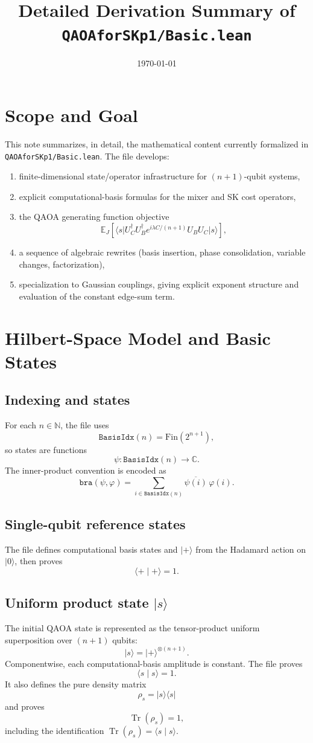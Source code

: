 \documentclass[11pt]{article}
\title{Detailed Derivation Summary of \texttt{QAOAforSKp1/Basic.lean}}
\author{}
\date{\today}
\newcommand{\C}{\mathbb{C}}
\newcommand{\E}{\mathbb{E}}
\newcommand{\tr}{\operatorname{Tr}}
\newcommand{\ket}[1]{\lvert #1\rangle}
\newcommand{\bra}[1]{\langle #1\rvert}
\newcommand{\ip}[2]{\langle #1\mid #2\rangle}
\begin{document}
\maketitle

\section{Scope and Goal}
This note summarizes, in detail, the mathematical content currently formalized in
\texttt{QAOAforSKp1/Basic.lean}. The file develops:
\begin{enumerate}
  \item finite-dimensional state/operator infrastructure for \((n+1)\)-qubit systems,
  \item explicit computational-basis formulas for the mixer and SK cost operators,
  \item the QAOA generating function objective
  \[
    \E_J\!\left[\bra{s}U_C^\dagger U_B^\dagger e^{i\lambda C/(n+1)}U_B U_C\ket{s}\right],
  \]
  \item a sequence of algebraic rewrites (basis insertion, phase consolidation, variable changes, factorization),
  \item specialization to Gaussian couplings, giving explicit exponent structure and evaluation of the constant edge-sum term.
\end{enumerate}

\section{Hilbert-Space Model and Basic States}
\subsection{Indexing and states}
For each \(n\in\mathbb{N}\), the file uses
\[
  \texttt{BasisIdx}(n) = \mathrm{Fin}(2^{n+1}),
\]
so states are functions
\[
  \psi : \texttt{BasisIdx}(n) \to \C.
\]
The inner-product convention is encoded as
\[
  \texttt{bra}(\psi,\varphi) = \sum_{i\in\texttt{BasisIdx}(n)} \overline{\psi(i)}\,\varphi(i).
\]

\subsection{Single-qubit reference states}
The file defines computational basis states and \(\ket{+}\) from the Hadamard action on \(\ket{0}\), then proves
\[
  \ip{+}{+}=1.
\]

\subsection{Uniform product state \(\ket{s}\)}
The initial QAOA state is represented as the tensor-product uniform superposition over \((n+1)\) qubits:
\[
  \ket{s} = \ket{+}^{\otimes(n+1)}.
\]
Componentwise, each computational-basis amplitude is constant. The file proves
\[
  \ip{s}{s}=1.
\]
It also defines the pure density matrix
\[
  \rho_s = \ket{s}\!\bra{s}
\]
and proves
\[
  \tr(\rho_s)=1,
\]
including the identification \(\tr(\rho_s)=\ip{s}{s}\).
\end{document}
